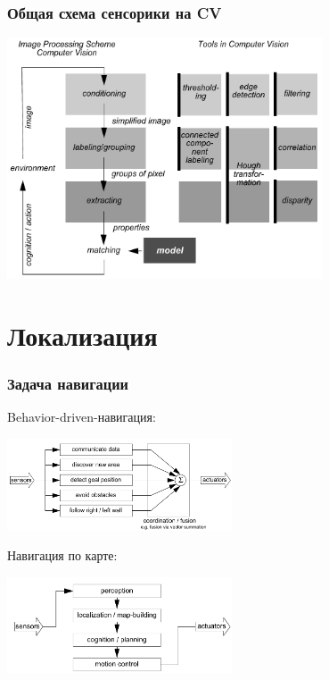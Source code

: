 \documentclass{../../slides-style}
\begin{document}
    \begin{frame}
        \frametitle{Общая схема сенсорики на CV}
        \begin{center}
            \includegraphics[width=0.7\textwidth]{cvScheme.png}
        \end{center}
    \end{frame}

    \section{Локализация}

    \begin{frame}
        \frametitle{Задача навигации}
        Behavior-driven-навигация:
        \begin{center}
            \includegraphics[width=0.5\textwidth]{behaviorNavigation.png}
        \end{center}

        Навигация по карте:
        \begin{center}
            \includegraphics[width=0.5\textwidth]{mapBasedNavigation.png}
        \end{center}
    \end{frame}
\end{document}
